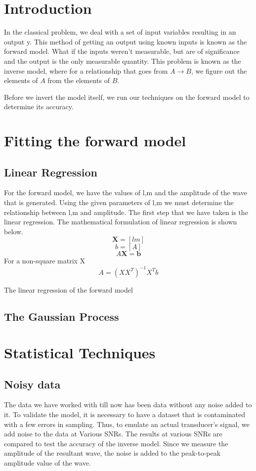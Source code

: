 \section{Introduction}
In the classical problem, we deal with a set of input variables resulting in an output y. This method of getting an output using known inputs is known as the forward model. What if the inputs weren't measurable, but are of significance and the output is the only measurable quantity. This problem is known as the inverse model, where for a relationship that goes from $A \longrightarrow B$, we figure out the elements of $A$ from the elements of $B$. 

Before we invert the model itself, we run our techniques on the forward model to determine its accuracy.  
\section{Fitting the forward model}
\subsection{Linear Regression}
For the forward model, we have the values of l,m and the amplitude of the wave that is generated. Using the given parameters of l,m we must determine the relationship between l,m and amplitude. The first step that we have taken is the linear regression. The mathematical formulation of linear regression is shown below.
$$\textbf{X} = [l m]$$
$$b = [A]$$
\begin{equation}
A\textbf{X} = \textbf{b}
\end{equation}
For a non-square matrix X
\begin{equation}
A = (XX^T)^{-1}X^Tb
\end{equation}

The linear regression of the forward model 
\subsection{The Gaussian Process}
\section{Statistical Techniques}
\subsection{Noisy data}
The data we have worked with till now has been data without any noise added to it. To validate the model, it is necessary to have a dataset that is contaminated with a few errors in sampling. Thus, to emulate an actual transducer's signal, we add noise to the data at Various SNRs. The results at various SNRs are compared to test the accuracy of the inverse model. Since we measure the amplitude of the resultant wave, the noise is added to the peak-to-peak amplitude value of the wave. 
